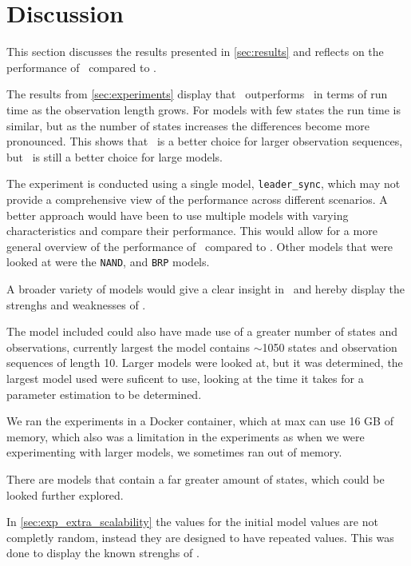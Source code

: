 \section{Discussion}\label{sec:discussion}
This section discusses the results presented in \autoref{sec:results} and reflects on the performance of \Cupaal\ compared to \Jajapy.

The results from \autoref{sec:experiments} display that \Cupaal\ outperforms \Jajapy\ in terms of run time as the observation length grows.
For models with few states the run time is similar, but as the number of states increases the differences become more pronounced.
This shows that \Cupaal\  is a better choice for larger observation sequences, but \Jajapy\ is still a better choice for large models.

The experiment is conducted using a single model, \texttt{leader\_sync}, which may not provide a comprehensive view of the performance across different scenarios.
A better approach would have been to use multiple models with varying characteristics and compare their performance.
This would allow for a more general overview of the performance of \Cupaal\ compared to \Jajapy.
Other models that were looked at were the \texttt{NAND}, and \texttt{BRP} models. 

A broader variety of models would give a clear insight in \Cupaal\ and hereby display the strenghs and weaknesses of \Cupaal.


The model included could also have made use of a greater number of states and observations, currently largest the model contains $\sim$1050 states and observation sequences of length 10.
Larger models were looked at, but it was determined, the largest model used were suficent to use, looking at the time it takes for a parameter estimation to be determined.

We ran the experiments in a Docker container, which at max can use 16 GB of memory, which also was a limitation in the experiments as when we were experimenting with larger models, we sometimes ran out of memory.

There are models that contain a far greater amount of states, which could be looked further explored.

In \autoref{sec:exp_extra_scalability} the values for the initial model values are not completly random, instead they are designed to have repeated values.
This was done to display the known strenghs of \Cupaal.

